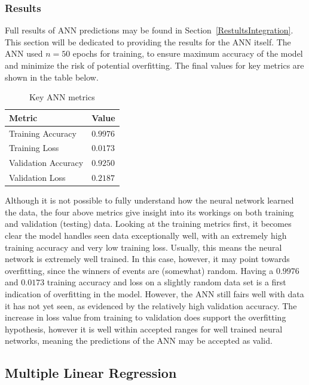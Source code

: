 \documentclass{mcmthesis}
\begin{document}
\subsubsection{Results}

Full results of ANN predictions may be found in Section~\ref{RestultsIntegration}. This section will be dedicated to providing the results for the ANN itself. The ANN used $n=50$ epochs for training, to ensure maximum accuracy of the model and minimize the risk of potential overfitting. The final values for key metrics are shown in the table below.

\begin{table}[H]
\caption{Key ANN metrics}
\centering
\vspace{5pt}
\begin{tabularx}{\textwidth} {
  >{\raggedright\arraybackslash}X 
  >{\raggedright\arraybackslash}X  }
\hline
 \textbf{Metric} & \textbf{Value} \\   
 \hline\hline
  Training Accuracy & $0.9976$\\ 
  Training Loss & $0.0173$\\
 Validation Accuracy & $0.9250$\\
 Validation Loss & $0.2187$\\ \hline
\end{tabularx}
\end{table}

Although it is not possible to fully understand how the neural network learned the data, the four above metrics give insight into its workings on both training and validation (testing) data. Looking at the training metrics first, it becomes clear the model handles seen data exceptionally well, with an extremely high training accuracy and very low training loss. Usually, this means the neural network is extremely well trained. In this case, however, it may point towards overfitting, since the winners of events are (somewhat) random. Having a $0.9976$ and $0.0173$ training accuracy and loss on a slightly random data set is a first indication of overfitting in the model. However, the ANN still fairs well with data it has not yet seen, as evidenced by the relatively high validation accuracy. The increase in loss value from training to validation does support the overfitting hypothesis, however it is well within accepted ranges for well trained neural networks, meaning the predictions of the ANN may be accepted as valid.

\subsection{Multiple Linear Regression}
\end{document}
